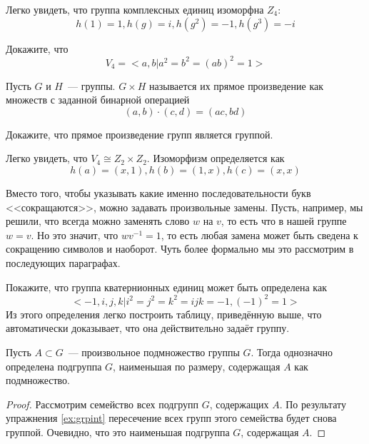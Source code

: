 \begin{example}
	Легко увидеть, что группа комплексных единиц изоморфна $Z_4$:
	\[
	h(1) = 1, h(g) = i, h(g^2) = -1, h(g^3) = -i
	\]
\end{example}

\begin{exercise}
	Докажите, что
	\[
	V_4 = <a, b | a^2 = b^2 = (ab)^2 = 1>
	\]
\end{exercise}

\begin{definition}
	Пусть $G$ и $H$~--- группы.  $G\times H$ называется их прямое произведение как множеств с заданной бинарной операцией
	\[
	(a, b) \cdot (c, d) = (ac, bd)
	\]
\end{definition}

\begin{exercise}
	Докажите, что прямое произведение групп является группой.
\end{exercise}

\begin{example}
	Легко увидеть, что $V_4 \cong Z_2 \times Z_2$. Изоморфизм определяется как
	\[
	h(a) = (x, 1), h(b) = (1, x), h(c) = (x, x)
	\]
\end{example}

Вместо того, чтобы указывать какие именно последовательности букв <<сокращаются>>, можно задавать произвольные замены. Пусть, например, мы решили, что всегда можно заменять слово $w$ на $v$, то есть что в нашей группе $w=v$. Но это значит, что $wv^{-1} = 1$, то есть любая замена может быть сведена к сокращению символов и наоборот. Чуть более формально мы это рассмотрим в последующих параграфах.

\begin{exercise}
	Покажите, что группа кватернионных единиц может быть определена как
	\[
	<-1, i, j, k | i^2 = j^2 = k^2 = ijk = -1, (-1)^2 = 1>
	\]
	Из этого определения легко построить таблицу, приведённую выше, что автоматически доказывает, что она действительно задаёт группу.
\end{exercise}

\begin{thm}
	Пусть $A\subset G$~--- произвольное подмножество группы $G$. Тогда однозначно определена подгруппа $G$, наименьшая по размеру, содержащая $A$ как подмножество.
\end{thm}
\begin{proof}
	Рассмотрим семейство всех подгрупп $G$, содержащих $A$. По результату упражнения \ref{ex:grpint} пересечение всех групп этого семейства будет снова группой. Очевидно, что это наименьшая подгруппа $G$, содержащая $A$.
\end{proof}

